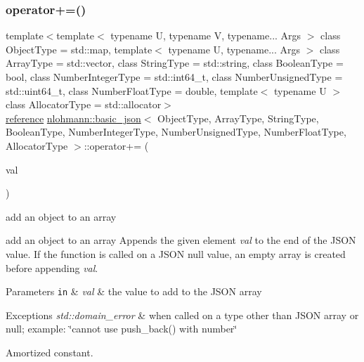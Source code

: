 \subsubsection{\texorpdfstring{operator+=()}{operator+=()}\hspace{0.1cm}{\footnotesize\ttfamily [1/4]}}
{\footnotesize\ttfamily template$<$template$<$ typename U, typename V, typename... Args $>$ class Object\+Type = std\+::map, template$<$ typename U, typename... Args $>$ class Array\+Type = std\+::vector, class String\+Type  = std\+::string, class Boolean\+Type  = bool, class Number\+Integer\+Type  = std\+::int64\+\_\+t, class Number\+Unsigned\+Type  = std\+::uint64\+\_\+t, class Number\+Float\+Type  = double, template$<$ typename U $>$ class Allocator\+Type = std\+::allocator$>$ \\
\hyperlink{classnlohmann_1_1basic__json_a3ec8e17be8732fe436e9d6733f52b7a3}{reference} \hyperlink{classnlohmann_1_1basic__json}{nlohmann\+::basic\+\_\+json}$<$ Object\+Type, Array\+Type, String\+Type, Boolean\+Type, Number\+Integer\+Type, Number\+Unsigned\+Type, Number\+Float\+Type, Allocator\+Type $>$\+::operator+= (\begin{DoxyParamCaption}\item[{\hyperlink{classnlohmann_1_1basic__json}{basic\+\_\+json}$<$ Object\+Type, Array\+Type, String\+Type, Boolean\+Type, Number\+Integer\+Type, Number\+Unsigned\+Type, Number\+Float\+Type, Allocator\+Type $>$ \&\&}]{val }\end{DoxyParamCaption})\hspace{0.3cm}{\ttfamily [inline]}}



add an object to an array 

add an object to an array Appends the given element {\itshape val} to the end of the J\+S\+ON value. If the function is called on a J\+S\+ON null value, an empty array is created before appending {\itshape val}.


\begin{DoxyParams}[1]{Parameters}
\mbox{\tt in}  & {\em val} & the value to add to the J\+S\+ON array\\
\hline
\end{DoxyParams}

\begin{DoxyExceptions}{Exceptions}
{\em std\+::domain\+\_\+error} & when called on a type other than J\+S\+ON array or null; example\+: {\ttfamily \char`\"{}cannot use push\+\_\+back() with number\char`\"{}}\\
\hline
\end{DoxyExceptions}
Amortized constant.

